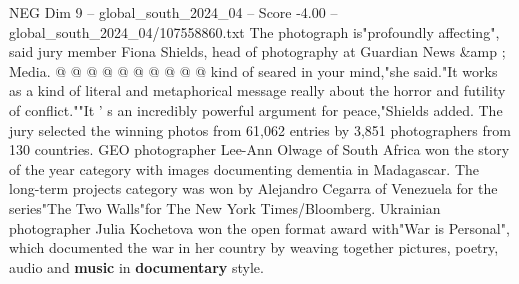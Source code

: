 \begin{textsample}{NEG Dim 9 – global\_south\_2024\_04 – Score -4.00 – global\_south\_2024\_04/107558860.txt}
The photograph is"profoundly affecting", said jury member Fiona Shields, head of photography at Guardian News \&amp ; Media. @ @ @ @ @ @ @ @ @ @ kind of seared in your mind,"she said."It works as a kind of literal and metaphorical message really about the horror and futility of conflict.""It ' s an incredibly powerful argument for peace,"Shields added.
The jury selected the winning photos from 61,062 entries by 3,851 photographers from 130 countries.
GEO photographer Lee-Ann Olwage of South Africa won the story of the year category with images documenting dementia in Madagascar.
The long-term projects category was won by Alejandro Cegarra of Venezuela for the series"The Two Walls"for The New York Times/Bloomberg.
Ukrainian photographer Julia Kochetova won the open format award with"War is Personal", which documented the war in her country by weaving together pictures, poetry, audio and \textbf{music} in \textbf{documentary} style.

\end{textsample}
